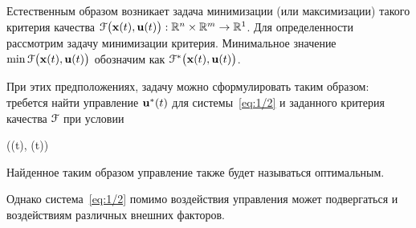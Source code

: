 Естественным образом возникает задача минимизации (или максимизации) такого критерия качества $\mathcal{F}\bigl(\mathbf{x}(t), \mathbf{u}(t)\bigr): \mathbb{R}^{n} \times \mathbb{R}^{m} \to \mathbb{R}^{1}$. Для определенности рассмотрим задачу минимизации критерия. Минимальное значение $\min\mathcal{F}\bigl(\mathbf{x}(t), \mathbf{u}(t)\bigr)$ обозначим как $\mathcal{F}^{*}\bigl(\mathbf{x}(t), \mathbf{u}(t)\bigr)$.

При этих предположениях, задачу можно сформулировать таким образом: требется найти управление $\mathbf{u}^{*}(t)$ для системы~\ref{eq:1/2} и заданного критерия качества $\mathcal{F}$ при условии

	\funcF\bigl((t), (t)\bigr) \to \min {}
\eeq

Найденное таким образом управление также будет называться оптимальным.

\br

Однако система~\ref{eq:1/2} помимо воздействия управления может подвергаться и воздействиям различных внешних факторов.